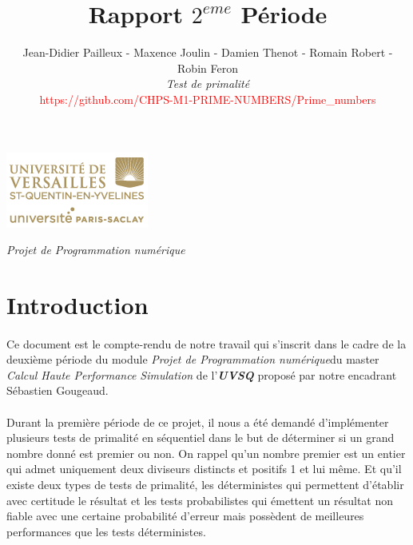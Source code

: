 

\title{\vspace{\fill}\textbf{\Huge Rapport $2^{eme}$ Période}}
\author{Jean-Didier Pailleux - Maxence Joulin - Damien Thenot - Romain Robert - Robin Feron 
	\vspace{2em}\\
	\textit{Test de primalité}\\
	\textcolor{red}{https://github.com/CHPS-M1-PRIME-NUMBERS/Prime\_numbers}
	\vspace{2em}
}


\clearpage
\maketitle\vspace{13em}
\begin{center}\includegraphics[scale=0.7]{logo.png}\end{center}
\begin{flushright}\textit{Projet de Programmation numérique}\end{flushright}
\newpage
\tableofcontents
\newpage\clearpage{}

	\section{Introduction}
	\paragraph{}Ce document est le compte-rendu de notre travail qui s'inscrit dans le cadre de la deuxième période du module \textit{Projet de Programmation numérique}du master \textit{Calcul Haute Performance Simulation} de l'\textit{\textbf{UVSQ}} proposé par notre encadrant Sébastien Gougeaud.
	
	\paragraph{}Durant la première période de ce projet, il nous a été demandé d'implémenter plusieurs tests de primalité en séquentiel dans le but de déterminer si un grand nombre donné est premier ou non. On rappel qu'un nombre premier est un entier qui admet uniquement deux diviseurs distincts et positifs 1 et lui même. Et qu'il existe deux types de tests de primalité, les déterministes qui permettent d'établir avec certitude le résultat et les tests probabilistes qui émettent un résultat non fiable avec une certaine probabilité d'erreur mais possèdent de meilleures performances que les tests déterministes.

